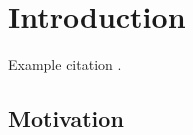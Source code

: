 \chapter{Introduction}
\label{chap:Introduction}

Example citation \autocite{lamport_time_1978}.

\section{Motivation}
\label{sec:Motivation}

